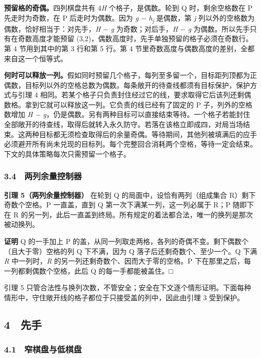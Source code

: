 \documentclass[
  a4paper,
]{article}
\begin{document}
\textbf{预留格的奇偶。}四列棋盘共有 4\emph{H} 个格子，是偶数。轮到 Q
时，剩余空格数在 P 先走时为奇数，在 P 后走时为偶数。因为 \emph{g} −
\emph{h}\textsubscript{\emph{j}} 是偶数，第 \emph{j}
列以外的空格数为偶数，恰好相当于：对先手，\emph{H} − \emph{g}
为奇数；对后手，\emph{H} − \emph{g}
为偶数。所以先手只有在奇数高度才能预留
(3,2)，偶数高度时，先手单独预留的格子必须在奇数行。第 4 节用到其中的第 3
行和第 5 行。第 4 节里奇数高度与偶数高度的差别，全都来自这一个恒等式。

\textbf{何时可以释放一列。}假如同时预留几个格子，每列至多留一个，目标距列顶都为正偶数，目标列以外的空格总数为偶数。每条敞开的待查线都须有目标保护，保护方式与引理
4
相同。若某个格子只负责封住经过它的线，要求取得它后该列还剩偶数格。拿到它就可以释放这一列。它负责的线已经有了固定的
P 子，列外的空格数增加 \emph{H −
g}，仍是偶数。另有两种目标可以直接结束等待。一个格子若能封住全部敞开的待查线，取得后就转入永久防守。若落在该格立即成四，对局当场结束。这两种目标都无须检查取得后的余量奇偶。等待期间，其他列被填满后的应手必须避开所有尚未兑现的目标列。每个完整回合消耗两个空格，等待一定会结束。下文的具体策略每次只需预留一个格子。

\subsubsection{3.4 两列余量控制器}\label{ux4e24ux5217ux4f59ux91cfux63a7ux5236ux5668}

\textbf{引理 5（两列余量控制器）} 在轮到 Q
的局面中，设恰有两列（组成集合 R）剩下奇数个空格。P 一直盖，直到 Q
第一次下满某一列，这一列必属于 R；P 随即下在 R
的另一列，此后一直盖到终局。所有规定的着法都合法，唯一的换列是那次被动换列。

\textbf{证明} Q 的一手加上 P
的盖，从同一列取走两格，各列的奇偶不变。剩下偶数个（且大于零）空格的列 Q
下不满，因为 Q 落子后还剩奇数个、至少一个。Q 下满 \emph{R}
中一列时，\emph{R} 的另一列还剩奇数个、因而大于零的空格。P
下在那里之后，每一列都剩偶数个空格，此后 Q 的每一手都能被盖住。□

引理 5
只管合法性与换列次数，不管安全；安全在下文逐个情形证明。下面每种情形中，守住敞开线的格子都位于只接受盖的列中，因此由引理
3 受到保护。

\subsection{4 先手}\label{ux5148ux624b}

\subsubsection{4.1 窄棋盘与低棋盘}\label{ux7a84ux68cbux76d8ux4e0eux4f4eux68cbux76d8}
\end{document}
